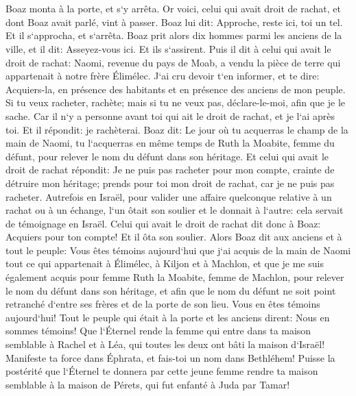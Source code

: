 \chapter{}

\verse Boaz monta à la porte, et s`y arrêta. Or voici, celui qui avait droit de rachat, et dont Boaz avait parlé, vint à passer. Boaz lui dit: Approche, reste ici, toi un tel. Et il s`approcha, et s`arrêta. 
\verse Boaz prit alors dix hommes parmi les anciens de la ville, et il dit: Asseyez-vous ici. Et ils s`assirent. 
\verse Puis il dit à celui qui avait le droit de rachat: Naomi, revenue du pays de Moab, a vendu la pièce de terre qui appartenait à notre frère Élimélec. 
\verse J`ai cru devoir t`en informer, et te dire: Acquiers-la, en présence des habitants et en présence des anciens de mon peuple. Si tu veux racheter, rachète; mais si tu ne veux pas, déclare-le-moi, afin que je le sache. Car il n`y a personne avant toi qui ait le droit de rachat, et je l`ai après toi. Et il répondit: je rachèterai. 
\verse Boaz dit: Le jour où tu acquerras le champ de la main de Naomi, tu l`acquerras en même temps de Ruth la Moabite, femme du défunt, pour relever le nom du défunt dans son héritage. 
\verse Et celui qui avait le droit de rachat répondit: Je ne puis pas racheter pour mon compte, crainte de détruire mon héritage; prends pour toi mon droit de rachat, car je ne puis pas racheter. 
\verse Autrefois en Israël, pour valider une affaire quelconque relative à un rachat ou à un échange, l`un ôtait son soulier et le donnait à l`autre: cela servait de témoignage en Israël. 
\verse Celui qui avait le droit de rachat dit donc à Boaz: Acquiers pour ton compte! Et il ôta son soulier. 
\verse Alors Boaz dit aux anciens et à tout le peuple: Vous êtes témoins aujourd`hui que j`ai acquis de la main de Naomi tout ce qui appartenait à Élimélec, à Kiljon et à Machlon, 
\verse et que je me suis également acquis pour femme Ruth la Moabite, femme de Machlon, pour relever le nom du défunt dans son héritage, et afin que le nom du défunt ne soit point retranché d`entre ses frères et de la porte de son lieu. Vous en êtes témoins aujourd`hui! 
\verse Tout le peuple qui était à la porte et les anciens dirent: Nous en sommes témoins! Que l`Éternel rende la femme qui entre dans ta maison semblable à Rachel et à Léa, qui toutes les deux ont bâti la maison d`Israël! Manifeste ta force dans Éphrata, et fais-toi un nom dans Bethléhem! 
\verse Puisse la postérité que l`Éternel te donnera par cette jeune femme rendre ta maison semblable à la maison de Pérets, qui fut enfanté à Juda par Tamar! 
